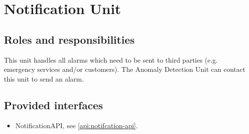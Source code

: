 \section{Notification Unit}
\label{element:notification-unit}

\subsection{Roles and responsibilities}

\npar This unit handles all alarms which need to be sent to third parties (e.g.
emergency services and/or customers). The Anomaly Detection Unit can contact
this unit to send an alarm.

\subsection{Provided interfaces}

\begin{itemize}
  \item NotificationAPI, see \ref{api:notifcation-api}.
\end{itemize}




